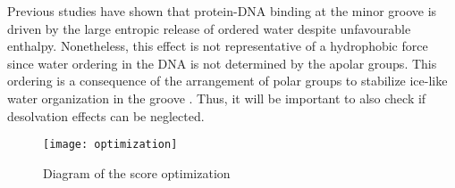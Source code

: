 \documentclass[
	12pt,				%
	openright,			%
	twoside,			%
	a4paper,			%
	english,			%
	french,				%
	spanish,			%
	brazil,				%
	]{abntex2}
\begin{document}
Previous studies have shown that protein-DNA binding at the minor groove is driven by the large entropic release of ordered water despite unfavourable enthalpy. Nonetheless, this effect is not representative of a hydrophobic force since water ordering in the DNA is not determined by the apolar groups. This ordering is a consequence of the arrangement of polar groups to stabilize ice-like water organization in the groove \cite{Privalov2007}. Thus, it will be important to also check if desolvation effects can be neglected.

\begin{figure}
	\centering
	\texttt{[image: optimization]}
	\caption{Diagram of the score optimization}
	\label{fig:optimization}
\end{figure}







\postextual



%
%





\printindex
\end{document}
